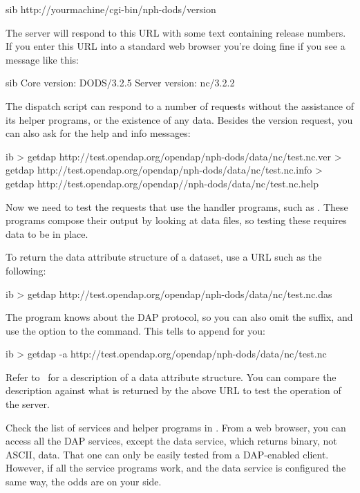 \documentclass{dods-book}
\begin{document}
\begin{vcode}{sib}
http://yourmachine/cgi-bin/nph-dods/version
\end{vcode}

The server will respond to this URL with some text containing release
numbers. If you enter this URL into a standard web browser you're
doing fine if you see a message like this:

\begin{vcode}{sib}
Core version: DODS/3.2.5
Server version: nc/3.2.2
\end{vcode}

The dispatch script can respond to a number of requests without the
assistance of its helper programs, or the existence of any data.
Besides the version request, you can also ask for the help and info
messages:

\begin{vcode}{ib}
> getdap http://test.opendap.org/opendap/nph-dods/data/nc/test.nc.ver
> getdap http://test.opendap.org/opendap/nph-dods/data/nc/test.nc.info
> getdap http://test.opendap.org/opendap//nph-dods/data/nc/test.nc.help
\end{vcode}

Now we need to test the requests that use the handler programs, such
as . These programs compose their output by
looking at data files, so testing these requires data to be in place.

To return the data attribute structure of a dataset, use a URL such as
the following:

\begin{vcode}{ib}
> getdap http://test.opendap.org/opendap/nph-dods/data/nc/test.nc.das
\end{vcode}

The  program knows about the DAP protocol, so you can
also omit the  suffix, and use the  option to the
 command.  This tells  to append 
for you:

\begin{vcode}{ib}
> getdap -a http://test.opendap.org/opendap/nph-dods/data/nc/test.nc
\end{vcode}

Refer to \DODSuser\ for a description of a data attribute structure.
You can compare the description against what is returned by the above
URL to test the operation of the server.

Check the list of services and helper programs in
. From a web browser, you can access
all the DAP services, except the data service, which returns binary,
not ASCII, data. That one can only be easily tested from a DAP-enabled
client. However, if all the service programs work, and the data
service is configured the same way, the odds are on your side.
\end{document}
